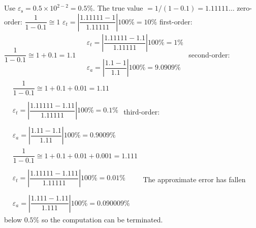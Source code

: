 \documentclass[../main.tex]{subfiles}
\begin{document}
\begin{enumerate}[label=\bfseries(\alph*)]
\section{}

Use $\varepsilon_{\mathrm{s}}=0.5 \times 10^{2-2}=0.5 \%$. The true value $=1 /(1-0.1)=1.11111 \ldots$
\bigbreak
zero-order:
\bigbreak
$\dfrac{1}{1-0.1} \cong 1$
\bigbreak
$\varepsilon_{t}=\left|\dfrac{1.11111-1}{1.11111}\right| 100 \%=10 \%$
\bigbreak
first-order:
\bigbreak
$\dfrac{1}{1-0.1} \cong 1+0.1=1.1$
\bigbreak$
\begin{aligned}
&\varepsilon_{t}=\left|\dfrac{1.11111-1.1}{1.11111}\right| 100 \%=1 \% \\\\
&\varepsilon_{a}=\left|\dfrac{1.1-1}{1.1}\right| 100 \%=9.0909 \%
\end{aligned}$
\bigbreak
second-order:
\bigbreak$
\begin{aligned}
&\dfrac{1}{1-0.1} \cong 1+0.1+0.01=1.11 \\\\
&\varepsilon_{t}=\left|\dfrac{1.11111-1.11}{1.11111}\right| 100 \%=0.1 \% \\\\
&\varepsilon_{a}=\left|\dfrac{1.11-1.1}{1.11}\right| 100 \%=0.9009 \%
\end{aligned}$
\bigbreak
third-order:
\bigbreak$
\begin{aligned}
&\dfrac{1}{1-0.1} \cong 1+0.1+0.01+0.001=1.111 \\\\
&\varepsilon_{t}=\left|\dfrac{1.11111-1.111}{1.11111}\right| 100 \%=0.01 \% \\\\
&\varepsilon_{a}=\left|\dfrac{1.111-1.11}{1.111}\right| 100 \%=0.090009 \%
\end{aligned}$
\bigbreak
The approximate error has fallen below $0.5 \%$ so the computation can be terminated.
\bigbreak



\end{enumerate}
\end{document}
